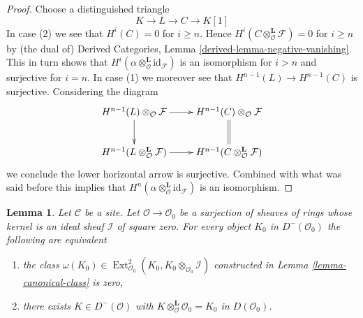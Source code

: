 \documentclass{stacks-project}
\theoremstyle{plain}
\newtheorem{lemma}[subsection]{Lemma}
\theoremstyle{definition}
\theoremstyle{remark}
\numberwithin{equation}{subsection}
\def\Ext{\mathop{\mathrm{Ext}}\nolimits}
\begin{document}
\begin{proof}
Choose a distinguished triangle
$$
K \to L \to C \to K[1]
$$
In case (2) we see that $H^i(C) = 0$ for $i \geq n$.
Hence $H^i(C \otimes_\mathcal{O}^\mathbf{L} \mathcal{F}) = 0$
for $i \geq n$ by (the dual of)
Derived Categories, Lemma \ref{derived-lemma-negative-vanishing}.
This in turn shows that
$H^i(\alpha \otimes_\mathcal{O}^\mathbf{L} \text{id}_\mathcal{F})$
is an isomorphism for $i > n$ and surjective for $i = n$.
In case (1) we moreover see that $H^{n - 1}(L) \to H^{n - 1}(C)$
is surjective. Considering the diagram
$$
\xymatrix{
H^{n - 1}(L) \otimes_\mathcal{O} \mathcal{F} \ar[r] \ar[d] &
H^{n - 1}(C) \otimes_\mathcal{O} \mathcal{F} \ar@{=}[d] \\
H^{n - 1}(L \otimes_\mathcal{O}^\mathbf{L} \mathcal{F}) \ar[r] &
H^{n - 1}(C \otimes_\mathcal{O}^\mathbf{L} \mathcal{F})
}
$$
we conclude the lower horizontal arrow is surjective. Combined with what
was said before this implies that
$H^n(\alpha \otimes_\mathcal{O}^\mathbf{L} \text{id}_\mathcal{F})$
is an isomorphism.
\end{proof}

\begin{lemma}
\label{lemma-canonical-class-obstruction}
Let $\mathcal{C}$ be a site. Let $\mathcal{O} \to \mathcal{O}_0$
be a surjection of sheaves of rings whose kernel is an ideal sheaf
$\mathcal{I}$ of square zero. For every object
$K_0$ in $D^-(\mathcal{O}_0)$ the following are equivalent
\begin{enumerate}
\item  the class
$\omega(K_0) \in
\Ext^2_{\mathcal{O}_0}(K_0, K_0 \otimes_{\mathcal{O}_0} \mathcal{I})$
constructed in Lemma \ref{lemma-canonical-class} is zero,
\item there exists $K \in D^-(\mathcal{O})$ with
$K \otimes_\mathcal{O}^\mathbf{L} \mathcal{O}_0 = K_0$
in $D(\mathcal{O}_0)$.
\end{enumerate}
\end{lemma}
\end{document}
